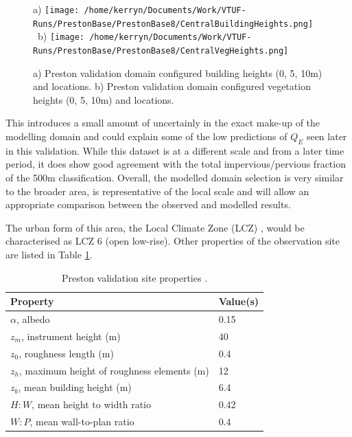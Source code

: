 \documentclass[preprint,12pt,authoryear]{elsarticle}
\begin{document}
%

\begin{figure}[!htbp]a)
\texttt{[image: /home/kerryn/Documents/Work/VTUF-Runs/PrestonBase/PrestonBase8/CentralBuildingHeights.png]} ~b) \texttt{[image: /home/kerryn/Documents/Work/VTUF-Runs/PrestonBase/PrestonBase8/CentralVegHeights.png]}
\caption{a) Preston validation domain configured building heights (0, 5, 10m) and locations.\label{fig:PrestonBldHt} b) Preston validation domain configured vegetation heights (0, 5, 10m) and locations.\label{fig:PrestonVegHt}}      
\end{figure}


This introduces a small amount of uncertainly in the exact make-up of the modelling domain and could explain some of the low predictions of $Q_{E}$ seen later in this validation. While this dataset is at a different scale and from a later time period, it does show good agreement with the total impervious/pervious fraction of the 500m classification. Overall, the modelled domain selection is very similar to the broader area, is representative of the local scale and will allow an appropriate comparison between the observed and modelled results. 

The urban form of this area, the Local Climate Zone (LCZ) \citep{Stewart2012b}, would be characterised as LCZ 6 (open low-rise).  Other properties of the observation site are listed in Table \ref{tab:prvalpara}.

\begin{table}[!htbp]
\caption{Preston validation site properties \citep{Coutts2007}. \label{tab:prvalpara}}     
\begin{tabular}{| l | l |}
\hline
\textbf{Property} & \textbf{Value(s)} \\ \hline
$\alpha$, albedo & 0.15  \\ \hline
$z_{m}$, instrument height (m)&  40  \\ \hline
$z_{0}$, roughness length (m)& 0.4  \\ \hline
$z_{h}$, maximum height of roughness elements (m)& 12  \\ \hline
$z_{b}$, mean building height (m)& 6.4  \\ \hline
$H:W$, mean height to width ratio& 0.42  \\ \hline
$W:P$, mean wall-to-plan ratio &0.4  \\ \hline
\end{tabular}
\end{table}
\end{document}
